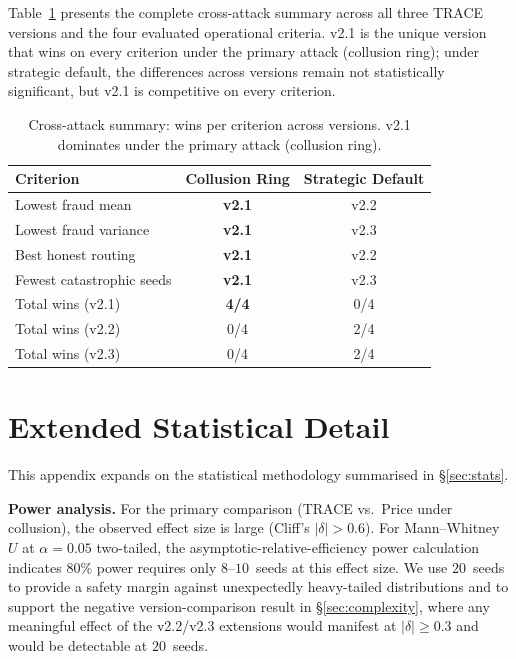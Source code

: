 \documentclass[sigconf,nonacm,10pt]{acmart}
\begin{document}
Table~\ref{tab:fullstats} presents the complete cross-attack
summary across all three TRACE versions and the four evaluated
operational criteria. v2.1 is the unique version that wins on
every criterion under the primary attack (collusion ring); under
strategic default, the differences across versions remain not
statistically significant, but v2.1 is competitive on every
criterion.

\begin{table}[t]
  \centering
  \caption{Cross-attack summary: wins per criterion across
    versions. v2.1 dominates under the primary attack (collusion
    ring).}
  \label{tab:fullstats}
  \small
  \begin{tabular}{lcc}
    \toprule
    Criterion & Collusion Ring & Strategic Default \\
    \midrule
    Lowest fraud mean        & \textbf{v2.1} & v2.2 \\
    Lowest fraud variance    & \textbf{v2.1} & v2.3 \\
    Best honest routing      & \textbf{v2.1} & v2.2 \\
    Fewest catastrophic seeds& \textbf{v2.1} & v2.3 \\
    \midrule
    Total wins (v2.1)        & \textbf{4/4} & 0/4 \\
    Total wins (v2.2)        & 0/4 & 2/4 \\
    Total wins (v2.3)        & 0/4 & 2/4 \\
    \bottomrule
  \end{tabular}
\end{table}

\section{Extended Statistical Detail}
\label{app:extstats}

This appendix expands on the statistical methodology summarised
in \S\ref{sec:stats}.

\noindent\textbf{Power analysis.}
For the primary comparison (TRACE vs.\ Price under collusion),
the observed effect size is large
(Cliff's $|\delta| > 0.6$). For Mann--Whitney $U$ at
$\alpha = 0.05$ two-tailed, the asymptotic-relative-efficiency
power calculation indicates $80\%$ power requires only
$8$--$10$~seeds at this effect size. We use $20$~seeds to
provide a safety margin against unexpectedly heavy-tailed
distributions and to support the negative version-comparison
result in \S\ref{sec:complexity}, where any meaningful effect of
the v2.2/v2.3 extensions would manifest at $|\delta| \ge 0.3$
and would be detectable at $20$~seeds.
\end{document}
